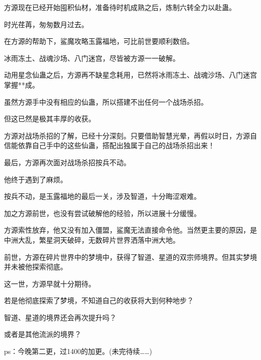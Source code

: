 \begin{this_body}
方源现在已经开始囤积仙材，准备待时机成熟之后，炼制六转全力以赴蛊。

时光荏苒，匆匆数月过去。

在方源的帮助下，鲨魔攻略玉露福地，可比前世要顺利数倍。

冰雨冻土、战魂沙场、八门迷宫，尽皆被方源一一破解。

动用星念仙蛊之后，方源再不缺星念耗用，已然将冰雨冻土、战魂沙场、八门迷宫掌握**成。

虽然方源手中没有相应的仙蛊，所以搭建不出任何一个战场杀招。

但这已然是极其丰厚的收获。

方源对战场杀招的了解，已经十分深刻。只要借助智慧光晕，再假以时日，方源自信能依靠自己手中的这些仙蛊，搭配出独属于自己的战场杀招出来！

最后，方源再次面对战场杀招按兵不动。

他终于遇到了麻烦。

按兵不动，是玉露福地的最后一关，涉及智道，十分晦涩艰难。

加之方源前世，也没有尝试破解他的经验，所以进展十分缓慢。

方源索性放弃，他又没有加入僵盟，鲨魔无法直接命令他。当然更主要的原因，是中洲大乱，繁星洞天破碎，无数碎片世界洒落中洲大地。

前世，方源在碎片世界中的梦境中，获得了智道、星道的双宗师境界。但其实梦境并未被他探索彻底。

这一世，方源早就十分期待。

若是他彻底探索了梦境，不知道自己的收获将大到何种地步？

智道、星道的境界还会再次提升吗？

或者是其他流派的境界？

ps：今晚第二更，过1400的加更。(未完待续……)

\end{this_body}

